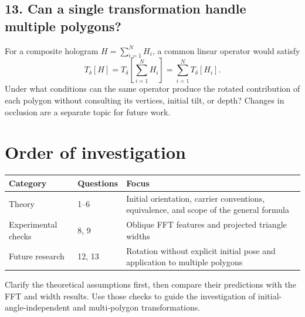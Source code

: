 \documentclass[a4paper,10pt]{article}
\begin{document}
\subsection*{13. Can a single transformation handle multiple polygons?}
For a composite hologram $H=\sum_{i=1}^{N}H_i$, a common linear operator would satisfy
\[
 T_\delta[H]=T_\delta\!\left[\sum_{i=1}^{N}H_i\right]
             =\sum_{i=1}^{N}T_\delta[H_i].
\]
Under what conditions can the same operator produce the rotated contribution of each polygon without consulting its vertices, initial tilt, or depth? Changes in occlusion are a separate topic for future work.

\section{Order of investigation}
\begin{center}
\begin{tabular}{@{}llp{.61\linewidth}@{}}
\toprule
Category & Questions & Focus\\\midrule
Theory & 1--6 & Initial orientation, carrier conventions, equivalence, and scope of the general formula\\
Experimental checks & 8, 9 & Oblique FFT features and projected triangle widths\\
Future research & 12, 13 & Rotation without explicit initial pose and application to multiple polygons\\
\bottomrule
\end{tabular}
\end{center}
Clarify the theoretical assumptions first, then compare their predictions with the FFT and width results. Use those checks to guide the investigation of initial-angle-independent and multi-polygon transformations.
\end{document}
